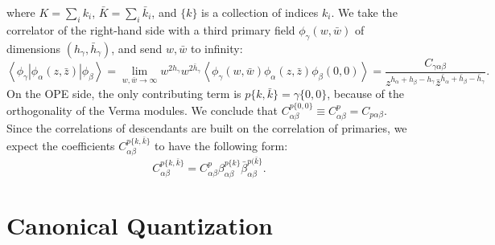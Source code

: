\documentclass[aps,prb,superscriptaddress,nofootinbib]{revtex4}
\begin{document}
where $K=\sum_{i} k_{i}$, $\bar{K}=\sum_{i} \bar{k}_{i}$, and $\{k\}$ is a collection of indices $k_{i}$.
We take the correlator of the right-hand side with a third primary field $\phi_{\gamma}(w, \bar{w})$ of dimensions $(h_{\gamma}, \bar{h}_{\gamma})$, and send $w,\bar w$ to infinity:
\begin{equation}
	\left\langle\phi_{\gamma}\left|\phi_{\alpha}(z, \bar{z})\right| \phi_{\beta}\right\rangle =\lim _{w, \bar{w} \rightarrow \infty} w^{2 h_{\gamma}} w^{2 \bar{h}_{\gamma}}\left\langle\phi_{\gamma}(w, \bar{w}) \phi_{\alpha}(z, \bar{z}) \phi_{\beta}(0,0)\right\rangle 
	=\frac{C_{\gamma\alpha\beta}}{z^{h_{\alpha}+h_{\beta}-h_{\gamma}} \bar{z}^{\bar{h}_{\alpha}+\bar{h}_{\beta}-\bar{h}_{\gamma}}}.
\end{equation}
On the OPE side, the only contributing term is $p\{k, \bar{k}\}=\gamma\{0,0\}$, because of the orthogonality of the Verma modules. 
We conclude that $C_{\alpha\beta}^{p\{0,0\}} \equiv C_{\alpha\beta}^{p}=C_{p\alpha\beta}$.
Since the correlations of descendants are built on the correlation of primaries, we expect the coefficients $C_{\alpha\beta}^{p\{k, \bar{k}\}}$ to have the following form:
\begin{equation}
	C_{\alpha\beta}^{p \{ k, \bar{k}\}}=C_{\alpha\beta}^{p} \beta_{\alpha\beta}^{p\{k\}} \bar{\beta}_{\alpha\beta}^{p(\bar{k}\}}.
\end{equation}






\section{Canonical Quantization}
\end{document}

